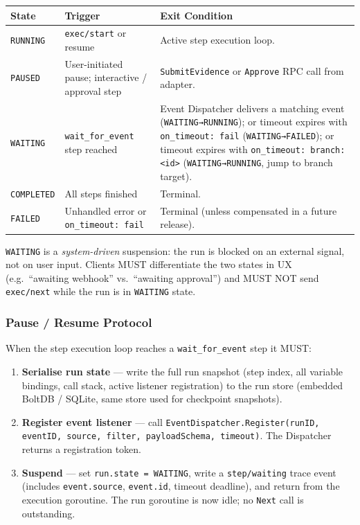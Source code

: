 \begin{center}
\begin{tabular}{|l|l|p{7.5cm}|}
\hline
\textbf{State} & \textbf{Trigger} & \textbf{Exit Condition} \\
\hline
\texttt{RUNNING}  & \texttt{exec/start} or resume & Active step execution loop. \\
\hline
\texttt{PAUSED}   & User-initiated pause; interactive / approval step & \texttt{SubmitEvidence} or \texttt{Approve} RPC call from adapter. \\
\hline
\texttt{WAITING}  & \texttt{wait\_for\_event} step reached & Event Dispatcher delivers a matching event (\texttt{WAITING→RUNNING}); or timeout expires with \texttt{on\_timeout: fail} (\texttt{WAITING→FAILED}); or timeout expires with \texttt{on\_timeout: branch:<id>} (\texttt{WAITING→RUNNING}, jump to branch target). \\
\hline
\texttt{COMPLETED} & All steps finished & Terminal. \\
\hline
\texttt{FAILED}   & Unhandled error or \texttt{on\_timeout: fail} & Terminal (unless compensated in a future release). \\
\hline
\end{tabular}
\end{center}

\texttt{WAITING} is a \emph{system-driven} suspension: the run is blocked on an external signal,
not on user input. Clients MUST differentiate the two states in UX (e.g.\ ``awaiting webhook''
vs.\ ``awaiting approval'') and MUST NOT send \texttt{exec/next} while the run is in
\texttt{WAITING} state.

\subsubsection*{Pause / Resume Protocol}

When the step execution loop reaches a \texttt{wait\_for\_event} step it MUST:

\begin{enumerate}
  \item \textbf{Serialise run state} — write the full run snapshot (step index, all variable
        bindings, call stack, active listener registration) to the run store (embedded BoltDB /
        SQLite, same store used for checkpoint snapshots).
  \item \textbf{Register event listener} — call
        \texttt{EventDispatcher.Register(runID, eventID, source, filter, payloadSchema, timeout)}.
        The Dispatcher returns a registration token.
  \item \textbf{Suspend} — set \texttt{run.state = WAITING}, write a
        \texttt{step/waiting} trace event (includes \texttt{event.source}, \texttt{event.id},
        timeout deadline), and return from the execution goroutine. The run goroutine is now
        idle; no \texttt{Next} call is outstanding.
\end{enumerate}

